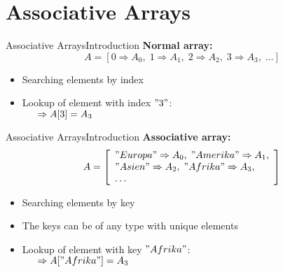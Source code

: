\section{Associative Arrays}


\begin{frame}{Associative Arrays}{Introduction}
  \textbf{Normal array:}\\
  \begin{displaymath}
    A = [0 \Rightarrow A_0, \; 1 \Rightarrow A_1, \;
      2 \Rightarrow A_2, \; 3 \Rightarrow A_3, \; \dotsc]
  \end{displaymath}
  \begin{itemize}
    \item
      Searching elements by {\color{Mittel-Blau}index}\\
    \item
      Lookup of element with index $"3"$:\\
      $\hspace{1.5em}\Rightarrow A[3] = A_3$
  \end{itemize}
\end{frame}


\begin{frame}{Associative Arrays}{Introduction}
  \textbf{Associative array:}\\
  \begin{displaymath}
    A = \left[\begin{array}{l}
      "Europa" \Rightarrow A_0, \; "Amerika" \Rightarrow A_1,\\
      "Asien" \Rightarrow A_2, \; "Afrika" \Rightarrow A_3,\\
      \dotsc
    \end{array}\right]
  \end{displaymath}
  \begin{itemize}
    \item
      Searching elements by {\color{Mittel-Blau}key}\\
    \item
      The keys can be of any type with unique elements
    \item
      Lookup of element with key $"Afrika"$:\\
      $\hspace{1.5em}\Rightarrow A["Afrika"] = A_3$
  \end{itemize}
\end{frame}

